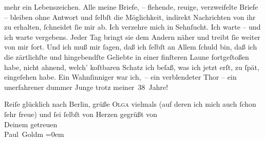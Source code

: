                mehr ein Lebenszeichen. Alle meine Briefe, – flehende, reuige, verzweifelte Briefe –
                  {\pb}bleiben ohne Antwort und{ }ſelbſt die Möglichkeit,
               indirekt Nachrichten\strikeout{\textcolor{gray}{×}} von ihr zu erhalten,{ }ſchneidet ſie mir ab. Ich verzehre mich in Sehnſucht. Ich warte – und
               ich warte vergebens. Jeder Tag bringt sie dem Andern näher und treibt{ }ſie weiter von mir fort. Und ich
               muß mir{ }ſagen, daß ich{ }ſelbſt an Allem{ }ſchuld \introOben{}bin\introOben{}, daß ich
               die zärtlichſte und hingebendſte Geliebte in einer finſteren Laune fortgeſtoßen habe,
               nicht ahnend, {\pb}welch’ koſtbaren Schatz ich beſaß,
               was ich jetzt erſt, zu{ }ſpät, eingeſehen habe. Ein Wahnſinniger war ich, – ein
               verblendeter Thor – ein unerfahrener dummer Junge trotz meiner 38 Jahre! {\dotsfour}\pend
           
\pstart
           Reiſe glücklich nach Berlin, grüße \textsc{Olga} vielmals (auf
               deren \label{K_L03363-4v}\label{K_L03363-4} ich mich auch{ }ſchon{ }ſehr freue) und{ }ſei{ }ſelbſt
               von Herzen gegrüßt von {\\[\baselineskip]}Deinem getreuen {\\[\baselineskip]}\spacefill\mbox{Paul Goldm}\pend
           \leftskip=0em{}\endnumbering{}  \newcommand{\dateiname}{L03363}\newcommand{\titel}{Paul Goldmann an Arthur Schnitzler, 17. 2. [1903]}\newcommand{\editorInnen}{Martin Anton Müller und Laura Untner}
